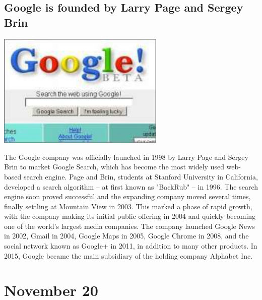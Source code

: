\documentclass[11pt]{report}
\begin{document}
\subsection{Google is founded by Larry Page and Sergey Brin}
\vspace{2mm}\begin{center}\includegraphics[width=8cm]{./img/googlebeta.jpg}\end{center}
The Google company was officially launched in 1998 by Larry Page and Sergey Brin to market Google Search, which has become the most widely used web-based search engine. Page and Brin, students at Stanford University in California, developed a search algorithm – at first known as "BackRub" – in 1996. The search engine soon proved successful and the expanding company moved several times, finally settling at Mountain View in 2003. This marked a phase of rapid growth, with the company making its initial public offering in 2004 and quickly becoming one of the world's largest media companies. The company launched Google News in 2002, Gmail in 2004, Google Maps in 2005, Google Chrome in 2008, and the social network known as Google+ in 2011, in addition to many other products. In 2015, Google became the main subsidiary of the holding company Alphabet Inc.

\section{November 20}
\end{document}
